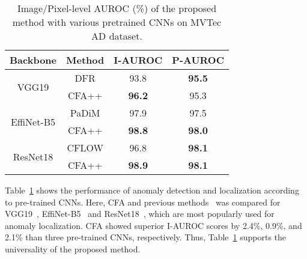 \documentclass[10pt,twocolumn,letterpaper]{article}
\begin{document}
        \begin{table}[t!]
\caption{Image/Pixel-level AUROC (\%) of the proposed method with various pretrained CNNs on MVTec AD dataset.}
\begin{center}\small
\begin{tabular}{c | c | c c}
    \toprule
    Backbone                           &      Method     & I-AUROC & P-AUROC  \\
    \midrule
    \multirow{2}{*}{VGG19}             &       DFR       &  93.8   &   \textbf{95.5}   \\    
                                       &     CFA++       &  \textbf{96.2}   &  95.3    \\ 
    \midrule
    \multirow{2}{*}{EffiNet-B5}        &    PaDiM        &  97.9   &     97.5    \\
&     CFA++       &  \textbf{98.8}  &    \textbf{98.0}    \\  
    \midrule
    \multirow{2}{*}{ResNet18}          &    CFLOW      &  96.8   &   \textbf{98.1}   \\    
                                       &     CFA++      &  \textbf{98.9}   &   \textbf{98.1}   \\ 
    \bottomrule
\end{tabular}
\end{center}
\label{table:backbone-ablation}\vspace{-0.15cm}
\end{table}         Table~\ref{table:backbone-ablation} shows the performance of anomaly detection and localization according to pre-trained CNNs. Here, CFA and previous methods~\cite{differnet,PaDiM,cflow} was compared for VGG19~\cite{vgg}, EffiNet-B5~\cite{efficientnet} and ResNet18~\cite{resnet}, which are most popularly used for anomaly localization. CFA showed superior I-AUROC scores by 2.4\%, 0.9\%, and 2.1\% than three pre-trained CNNs, respectively. Thus, Table~\ref{table:backbone-ablation} supports the universality of the proposed method.
        
\end{document}
